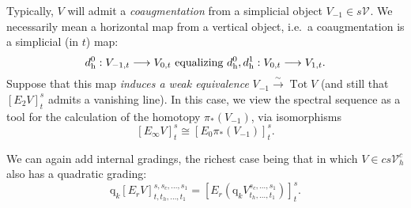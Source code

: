 \documentclass[11pt]{amsart} \renewcommand{\baselinestretch}{1.4}
\theoremstyle{plain}
\newtheorem{cor}[thm]{Corollary}
\theoremstyle{definition}
\DeclareMathOperator{\Tot}{Tot}
\renewcommand{\to}{\longrightarrow}
\newcommand{\scrC}{\mathscr{C}}
\newcommand{\calV}{\mathcal{V}}
\newcommand{\vect}[2]{\calV^{#1}_{#2}}
\newcommand{\quadgrad}[1]{\mathrm{q}_{#1}}
\newcommand{\algs}{{\scrC\!\textit{om}}}
\newcommand{\Edownup}[5]{[E_{#1}^{#2}#3]^{#4}_{#5}}
\newcommand{\dhor}{_\mathrm{h}}
\begin{document}
\begin{Conventions and notation}
Typically, $V$ will admit a \emph{coaugmentation} from a simplicial object $V_{-1}\in s\vect{}{}$.  We necessarily mean a horizontal map from a vertical object, i.e.\ a coaugmentation is a simplicial (in $t$) map:
\[d\dhor^0:V_{-1,t}\to V_{0,t}\textup{ equalizing }d\dhor^0,d\dhor^1:V_{0,t}\to V_{1,t}.\]
Suppose that this map \emph{induces a weak equivalence} $V_{-1}\overset{\sim}{\to}\Tot V$ (and still that $\Edownup{2}{}{V}{s}{t}$ admits a vanishing line).
In this case, we view the spectral sequence as a tool for the calculation of the homotopy $\pi_*(V_{-1})$, via  isomorphisms
\[\Edownup{\infty}{}{V}{s}{t}\cong \Edownup{0}{}{\pi_*(V_{-1})}{s}{t}.\]

We can again add internal gradings, the richest case being that in which  $V\in cs\vect{c}{h}$ also has a quadratic grading:
\[\quadgrad{k}\Edownup{r}{}{V}{s,s_c,\ldots,s_1}{t,t_h,\ldots,t_1}=\Edownup{r}{}{(\quadgrad{k}V^{s_c,\ldots,s_1}_{t_h,\ldots,t_1})}{s}{t}.\]
%
%
%
%
%
%
%


















\end{Conventions and notation}
\end{document}
